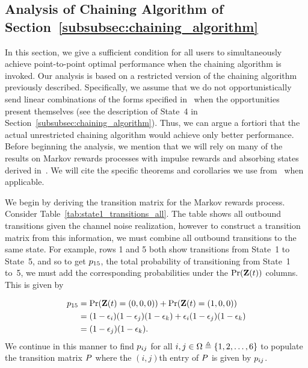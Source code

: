 \subsection{Analysis of Chaining Algorithm of Section~\ref{subsubsec:chaining_algorithm}}
\label{subsec:chaining_algorithm_analysis}

In this section, we give a sufficient condition for all users to simultaneously achieve point-to-point optimal performance when the chaining algorithm is invoked.  Our analysis is based on a restricted version of the chaining algorithm previously described.  Specifically, we assume that we do not opportunistically send linear combinations of the forms specified in~ when the opportunities present themselves (see the description of State~4 in Section~\ref{subsubsec:chaining_algorithm}). Thus, we can argue a fortiori that the actual unrestricted chaining algorithm would achieve only better performance.  Before beginning the analysis, we mention that we will rely on many of the results on Markov rewards processes with impulse rewards and absorbing states derived in~\cite{TMK_markov}.  We will cite the specific theorems and corollaries we use from~\cite{TMK_markov} when applicable. %

We begin by deriving the transition matrix for the Markov rewards process.  Consider Table~\ref{tab:state1_transitions_all}.  The table shows all outbound transitions given the channel noise realization, however to construct a transition matrix from this information, we must combine all outbound transitions to the same state.  For example, rows 1 and 5 both show transitions from State~1 to State~5, and so to get $p_{15}$, the total probability of transitioning from State~1 to~5, we must add the corresponding probabilities under the $\operatorname{Pr}(\mathbf{Z}(t))$ columns.  This is given by 

\begin{align}
	p_{15} &= \operatorname{Pr}(\mathbf{Z}(t) = (0, 0, 0)) + \operatorname{Pr}(\mathbf{Z}(t) = (1, 0, 0)) \\
	&= (1 -\epsilon_i)(1 -\epsilon_j)(1 - \epsilon_k) + \epsilon_i(1 -\epsilon_j)(1 - \epsilon_k) \\
	&= (1 -\epsilon_j)(1 - \epsilon_k).
\end{align}
We continue in this manner to find $p_{ij}$ for all $i, j \in \Omega \triangleq \{1, 2, \ldots, 6\}$ to populate the transition matrix $P$ where the $(i, j)$th entry of $P$ is given by $p_{ij}$.

